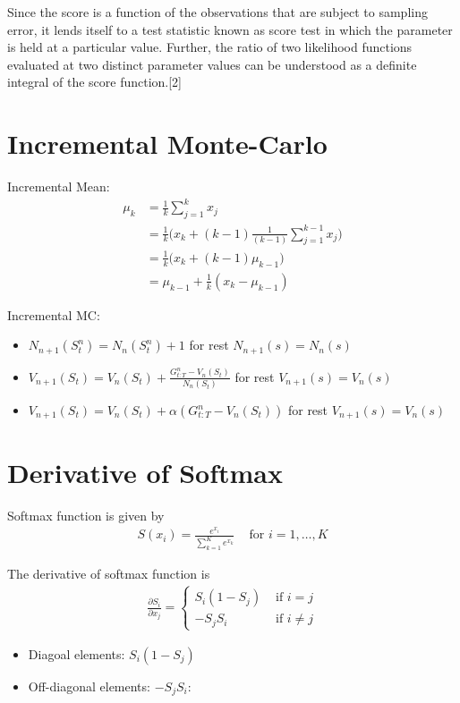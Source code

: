 \begin{appendices}
Since the score is a function of the observations that are subject to sampling error, it lends itself to a test statistic known as score test in which the parameter is held at a particular value. Further, the ratio of two likelihood functions evaluated at two distinct parameter values can be understood as a definite integral of the score function.[2]

\section{Incremental Monte-Carlo}
Incremental Mean:
\begin{align}
	\mu_k &= \frac{1}{k}\sum_{j=1}^k x_j\\
	&= \frac{1}{k}\Big(x_k+(k-1)\frac{1}{(k-1)}\sum_{j=1}^{k-1} x_j\Big)\\
	&= \frac{1}{k}\Big(x_k+(k-1)\mu_{k-1}\Big)\\
	&= \mu_{k-1}+\frac{1}{k}(x_k-\mu_{k-1})
	\label{eq:incremental_mean}
\end{align}

Incremental MC:
\begin{itemize}
	\item $N_{n+1}(S_t^n) = N_{n}(S_t^n) + 1$ for rest $N_{n+1}(s) = N_{n}(s)$
	\item $V_{n+1}(S_t) = V_{n}(S_t)+\frac{G_{t:T}^n -V_n(S_t)}{N_n(S_t)}$ for rest $V_{n+1}(s)= V_n(s)$ 
	\item $V_{n+1}(S_t) = V_{n}(S_t)+\alpha({G_{t:T}^n -V_n(S_t)})$ for rest $V_{n+1}(s)= V_n(s)$ 
\end{itemize}

\section{Derivative of Softmax}

Softmax function is given by
\begin{align*}
	S(x_{i}) = \frac{e^{x_i}}{\sum_{k=1}^K e^{x_k}} \;\;\;\text{ for } i = 1, \dots, K
\end{align*}

The derivative of softmax function is
\begin{align*}
\frac{\partial S_i}{\partial x_j} = 
\begin{cases}S_i(1-S_j) &\text{ if } i=j \\
-S_jS_i &\text{ if } i \neq j
\end{cases}
\end{align*}

\begin{itemize} 
	\item Diagoal elements: $S_i(1-S_j)$
	\item Off-diagonal elements: $-S_jS_i$:
\end{itemize}



\end{appendices}
